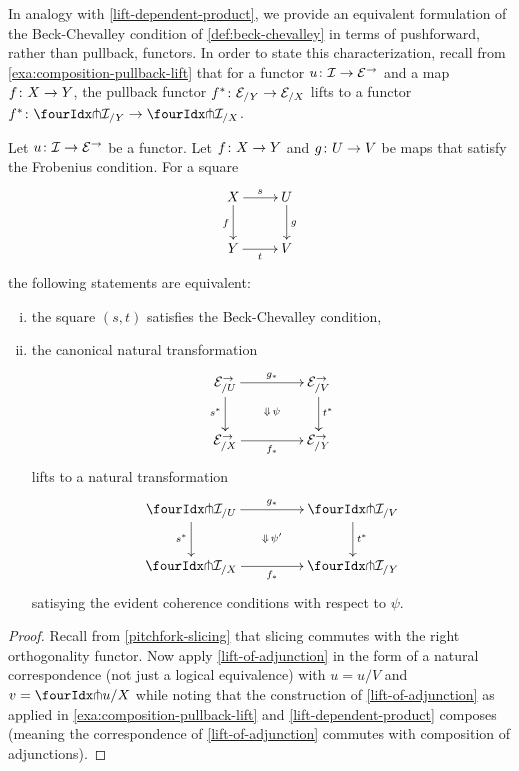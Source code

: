 \documentclass[reqno,10pt,a4paper,oneside,draft]{amsart}
\begin{document}
In analogy with \cref{lift-dependent-product}, we provide an equivalent formulation of the Beck-Chevalley condition of \cref{def:beck-chevalley} in terms of pushforward, rather than pullback, functors.
In order to state this characterization, recall from \cref{exa:composition-pullback-lift} that for a functor $u \colon \mathcal{I} \to \mathcal{E}^\to$ and a map $f \colon X \to Y$, the pullback functor $f^* \colon \mathcal{E}_{/Y} \to \mathcal{E}_{/X}$ lifts to a functor $f^* \co \liftr{\cal{I}}_{/Y} \to \liftr{\cal{I}}_{/X}$.


\begin{proposition} \label{lift-pushforward-BC}
Let $u \colon \mathcal{I} \to \mathcal{E}^\to$ be a functor.
Let $f \colon X \to Y$ and $g \colon U \to V$ be maps that satisfy the Frobenius condition.
For a square
\[
\xymatrix{
  X
  \ar[d]_{f}
  \ar[r]^{s}
&
  U
  \ar[d]^{g}
\\
  Y
  \ar[r]_{t}
&
  V
}
\]
the following statements are equivalent:
\begin{enumerate}[(i)]
\item the square $(s,t)$ satisfies the Beck-Chevalley condition,
\item the canonical natural transformation
\[
\xymatrix@C+2em{
  \cal{E}^\to_{/U}
  \ar[r]^{g_*} 
   \ar[d]_{s^*}
  \ar@{}[dr]|{\Downarrow \, \psi}
& 
\cal{E}^\to_{/V} 
 \ar[d]^{t^*}
\\
  \cal{E}^\to_{/X}
  \ar[r]_{f_*} 
&
  \cal{E}^\to_{/Y}
}
\]
lifts to a natural transformation
\[
\xymatrix@C+2em{
  \liftr{\cal{I}}_{/U}
  \ar[r]^{g_*} 
  \ar[d]_{s^*}
  \ar@{}[dr]|{\Downarrow \, \psi'}
&
  \liftr{\cal{I}}_{/V}
  \ar[d]^{t^*} 
\\
  \liftr{\cal{I}}_{/X}
  \ar[r]_{f_*} 
&
  \liftr{\cal{I}}_{/Y}
}
\]
satisying the evident coherence conditions with respect to $\psi$.
\end{enumerate}
\end{proposition}

\begin{proof}
Recall from \cref{pitchfork-slicing} that slicing commutes with the right orthogonality functor.
Now apply \cref{lift-of-adjunction} in the form of a natural correspondence (not just a logical equivalence) with $u = u/V$ and $v = \liftr{u}/X$ while noting that the construction of \cref{lift-of-adjunction} as applied in \cref{exa:composition-pullback-lift} and \cref{lift-dependent-product} composes (meaning the correspondence of \cref{lift-of-adjunction} commutes with composition of adjunctions).
\end{proof}
\end{document}
